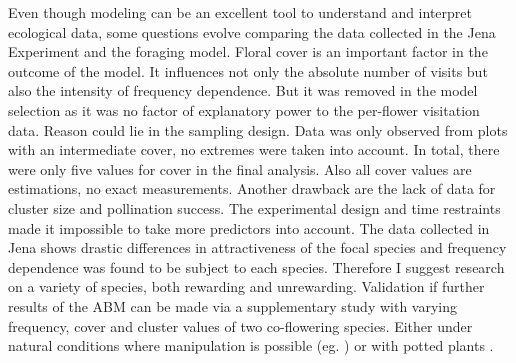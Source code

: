 Even though modeling can be an excellent tool to understand and interpret ecological data, some questions evolve comparing the data collected in the Jena Experiment and the foraging model.
Floral cover is an important factor in the outcome of the model. It influences not only the absolute number of visits but also the intensity of frequency dependence. But it was removed in the model selection as it was no factor of explanatory power to the per-flower visitation data. 
Reason could lie in the sampling design. Data was only observed from plots with an intermediate cover, no extremes were taken into account. In total, there were only five values for cover in the final analysis. Also all cover values are estimations, no exact measurements. Another drawback are the lack of data for cluster size and pollination success. The experimental design and time restraints made it impossible to take more predictors into account. 
The data collected in Jena shows drastic differences in attractiveness of the focal species and frequency dependence was found to be subject to each species. Therefore I suggest research on a variety of species, both rewarding and unrewarding. Validation if further results of the ABM can be made via a supplementary study with varying frequency, cover and cluster values of two co-flowering species. Either under natural conditions where manipulation is possible (eg. \citealt{Eckhart2006frequency,essenberg2012explaining}) or with potted plants \citep{epperson1987frequency}. 
